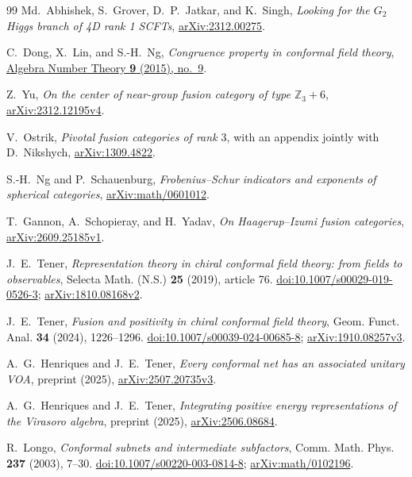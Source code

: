 \begin{thebibliography}{99}
Md.~Abhishek, S.~Grover, D.~P.~Jatkar, and K.~Singh,
\emph{Looking for the $G_2$ Higgs branch of 4D rank 1 SCFTs},
\href{https://arxiv.org/abs/2312.00275}{arXiv:2312.00275}.

C.~Dong, X.~Lin, and S.-H.~Ng,
\emph{Congruence property in conformal field theory},
\href{https://msp.org/ant/2015/9-9/ant-v9-n9-p03-s.pdf}{Algebra Number Theory
\textbf{9} (2015), no.~9}.

Z.~Yu,
\emph{On the center of near-group fusion category of type $\mathbb Z_3+6$},
\href{https://arxiv.org/abs/2312.12195v4}{arXiv:2312.12195v4}.

V.~Ostrik,
\emph{Pivotal fusion categories of rank $3$},
with an appendix jointly with D.~Nikshych,
\href{https://arxiv.org/abs/1309.4822}{arXiv:1309.4822}.

S.-H.~Ng and P.~Schauenburg,
\emph{Frobenius--Schur indicators and exponents of spherical categories},
\href{https://arxiv.org/abs/math/0601012}{arXiv:math/0601012}.

T.~Gannon, A.~Schopieray, and H.~Yadav,
\emph{On Haagerup--Izumi fusion categories},
\href{https://arxiv.org/abs/2609.25185v1}{arXiv:2609.25185v1}.

J.~E.~Tener,
\emph{Representation theory in chiral conformal field theory:
from fields to observables},
Selecta Math. (N.S.) \textbf{25} (2019), article 76.
\href{https://doi.org/10.1007/s00029-019-0526-3}{doi:10.1007/s00029-019-0526-3};
\href{https://arxiv.org/abs/1810.08168v2}{arXiv:1810.08168v2}.

J.~E.~Tener,
\emph{Fusion and positivity in chiral conformal field theory},
Geom. Funct. Anal. \textbf{34} (2024), 1226--1296.
\href{https://doi.org/10.1007/s00039-024-00685-8}{doi:10.1007/s00039-024-00685-8};
\href{https://arxiv.org/abs/1910.08257v3}{arXiv:1910.08257v3}.

A.~G.~Henriques and J.~E.~Tener,
\emph{Every conformal net has an associated unitary VOA},
preprint (2025),
\href{https://arxiv.org/abs/2507.20735v3}{arXiv:2507.20735v3}.

A.~G.~Henriques and J.~E.~Tener,
\emph{Integrating positive energy representations of the Virasoro algebra},
preprint (2025),
\href{https://arxiv.org/abs/2506.08684}{arXiv:2506.08684}.

R.~Longo,
\emph{Conformal subnets and intermediate subfactors},
Comm. Math. Phys. \textbf{237} (2003), 7--30.
\href{https://doi.org/10.1007/s00220-003-0814-8}{doi:10.1007/s00220-003-0814-8};
\href{https://arxiv.org/abs/math/0102196}{arXiv:math/0102196}.


\end{thebibliography}
